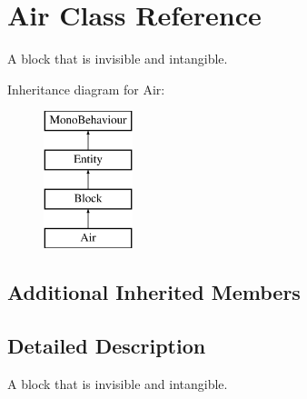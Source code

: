 \hypertarget{class_air}{}\section{Air Class Reference}
\label{class_air}


A block that is invisible and intangible.  


Inheritance diagram for Air\+:\begin{figure}[H]
\begin{center}
\leavevmode
\includegraphics[height=4.000000cm]{class_air}
\end{center}
\end{figure}
\subsection*{Additional Inherited Members}


\subsection{Detailed Description}
A block that is invisible and intangible. 

